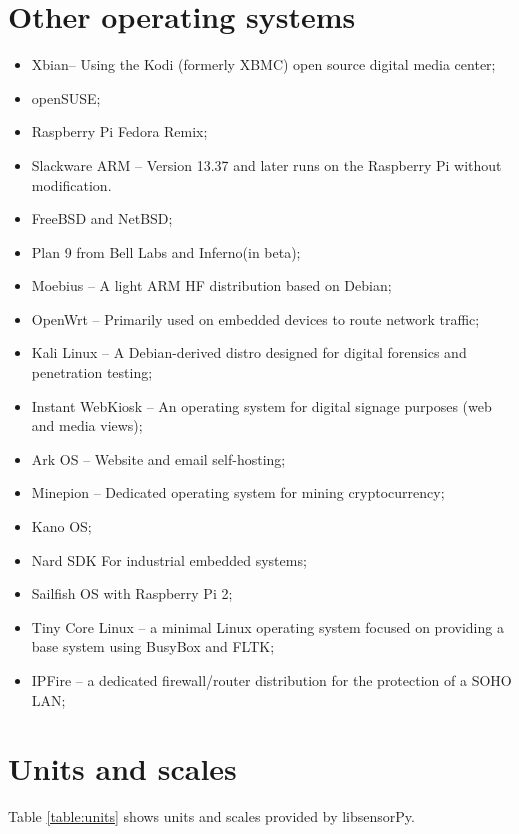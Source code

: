 \documentclass{acm_proc_article-sp}
\begin{document}
\section{Other operating systems}\label{sec:RPiOS}
\begin{itemize}
\item Xbian– Using the Kodi (formerly XBMC) open source digital media center;
\item openSUSE;
\item Raspberry Pi Fedora Remix;
\item Slackware ARM – Version 13.37 and later runs on the Raspberry Pi without modification.
\item FreeBSD and NetBSD;
\item Plan 9 from Bell Labs and Inferno(in beta);
\item Moebius – A light ARM HF distribution based on Debian;
\item OpenWrt – Primarily used on embedded devices to route network traffic;
\item Kali Linux – A Debian-derived distro designed for digital forensics and penetration testing;
\item Instant WebKiosk – An operating system for digital signage purposes (web and media views);
\item Ark OS – Website and email self-hosting;
\item Minepion – Dedicated operating system for mining cryptocurrency;
\item Kano OS;
\item Nard SDK For industrial embedded systems;
\item Sailfish OS with Raspberry Pi 2;
\item Tiny Core Linux – a minimal Linux operating system focused on providing a base system using BusyBox and FLTK;
\item IPFire – a dedicated firewall/router distribution for the protection of a SOHO LAN;
\end{itemize}

\newpage

\section{Units and scales}\label{sec:Units}
Table \ref{table:units} shows units and scales provided by libsensorPy.
\end{document}

